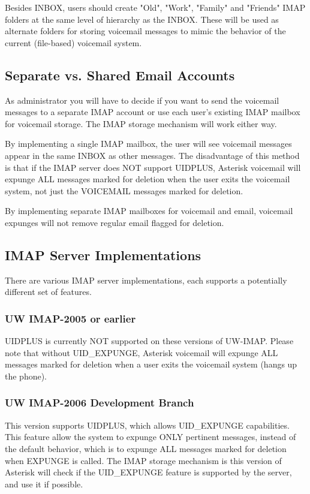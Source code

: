 Besides INBOX, users should create "Old", "Work", "Family" and "Friends"
IMAP folders at the same level of hierarchy as the INBOX.  These will be
used as alternate folders for storing voicemail messages to mimic the
behavior of the current (file-based) voicemail system.


\subsection{Separate vs. Shared Email Accounts}

As administrator you will have to decide if you want to send the voicemail
messages to a separate IMAP account or use each user's existing IMAP mailbox
for voicemail storage.  The IMAP storage mechanism will work either way.

By implementing a single IMAP mailbox, the user will see voicemail messages
appear in the same INBOX as other messages.  The disadvantage of this method
is that if the IMAP server does NOT support UIDPLUS, Asterisk voicemail will
expunge ALL messages marked for deletion when the user exits the voicemail
system, not just the VOICEMAIL messages marked for deletion.

By implementing separate IMAP mailboxes for voicemail and email, voicemail
expunges will not remove regular email flagged for deletion.


\subsection{IMAP Server Implementations}

There are various IMAP server implementations, each supports a potentially
different set of features.


\subsubsection{UW IMAP-2005 or earlier}

UIDPLUS is currently NOT supported on these versions of UW-IMAP.  Please note
that without UID\_EXPUNGE, Asterisk voicemail will expunge ALL messages marked
for deletion when a user exits the voicemail system (hangs up the phone).

\subsubsection{UW IMAP-2006 Development Branch}

This version supports UIDPLUS, which allows UID\_EXPUNGE capabilities.  This
feature allow the system to expunge ONLY pertinent messages, instead of the
default behavior, which is to expunge ALL messages marked for deletion when
EXPUNGE is called.  The IMAP storage mechanism is this version of Asterisk
will check if the UID\_EXPUNGE feature is supported by the server, and use it
if possible.

